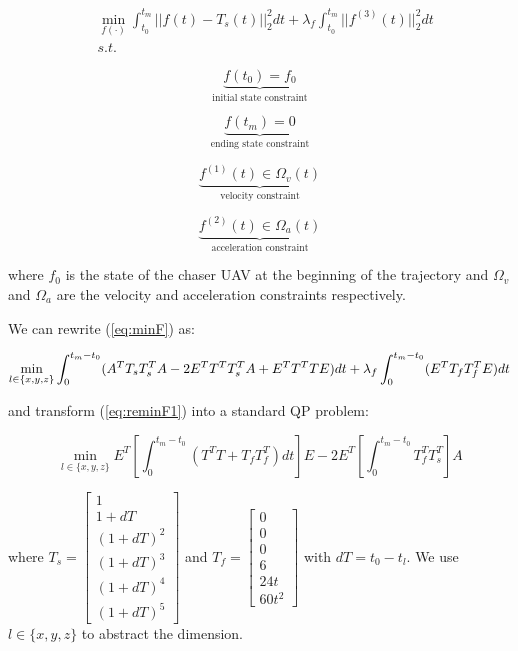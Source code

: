 \begin{equation}\label{eq:minF}
\begin{aligned}
&\min_{f(\cdot)} \int_{t_0}^{t_m} ||f(t)-T_s(t)||^2_{2}dt + \lambda_f\int_{t_0}^{t_m} ||f^{(3)}(t)||^2_{2}dt\\
&s.t.
\end{aligned}
\end{equation}

\begin{equation}
\underbrace{f(t_0)=f_0}_{\text{initial state constraint}}
\end{equation}

\begin{equation}
\underbrace{f(t_m)=0}_{\text{ending state constraint}}
\end{equation}

\begin{equation}
\underbrace{f^{(1)}(t) \in \Omega_{v}(t)}_{\text{velocity constraint}}
\end{equation}

\begin{equation}
\underbrace{f^{(2)}(t) \in \Omega_{a}(t)}_{\text{acceleration constraint}}
\end{equation}

\noindent
where $f_0$ is the state of the chaser UAV at the beginning of the trajectory and $\Omega_v$ and $\Omega_a$ are the velocity and acceleration constraints respectively.

We can rewrite (\ref{eq:minF}) as:

\begin{equation}\label{eq:reminF1}
\min_{l\in\{x,y,z\}}\int_{0}^{t_m-t_0} (A^TT_sT_s^TA-2E^TT^TT_s^TA+E^TT^TTE)dt + \lambda_f\int_{0}^{t_m-t_0} (E^TT_fT_f^TE)dt\\
\end{equation}

\noindent
and transform (\ref{eq:reminF1}) into a standard QP problem:

\begin{equation}\label{eq:reminF2}
\min_{l\in\{x,y,z\}}E^T[\int_{0}^{t_m-t_0}(T^TT+T_fT_f^T)dt]E-2E^T[\int_{0}^{t_m-t_0}T_f^TT_s^T]A
\end{equation}

\noindent
where $T_s = \begin{bmatrix}1\\1+dT\\(1+dT)^2\\(1+dT)^3\\(1+dT)^4\\(1+dT)^5\end{bmatrix}$ and $T_f=\begin{bmatrix}0\\0\\0\\6\\24t\\60t^2\end{bmatrix}$ with $dT=t_0-t_l$. We use $l\in\{x,y,z\}$ to abstract the dimension.

